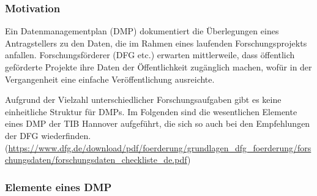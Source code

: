 \subsubsection{Motivation}

Ein Datenmanagementplan (DMP) dokumentiert die Überlegungen eines Antragstellers
zu den Daten, die im Rahmen eines laufenden Forschungsprojekts anfallen.
Forschungsförderer (DFG etc.) erwarten mittlerweile, dass öffentlich geförderte
Projekte ihre Daten der Öffentlichkeit zugänglich machen, wofür in der
Vergangenheit eine einfache Veröffentlichung ausreichte.

Aufgrund der Vielzahl unterschiedlicher Forschungsaufgaben gibt es keine
einheitliche Struktur für DMPs. Im Folgenden sind die wesentlichen Elemente
eines DMP der TIB Hannover aufgeführt, die sich so auch bei den Empfehlungen der
DFG wiederfinden.\\
(\url{https://www.dfg.de/download/pdf/foerderung/grundlagen_dfg_foerderung/forschungsdaten/forschungsdaten_checkliste_de.pdf})

\subsubsection{Elemente eines DMP}

